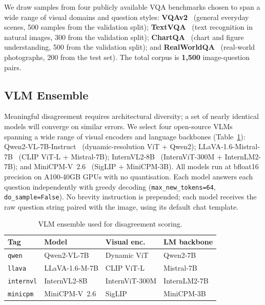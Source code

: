 \documentclass[10pt,twocolumn,letterpaper]{article}
\begin{document}
We draw samples from four publicly available VQA benchmarks chosen to span
a wide range of visual domains and question styles:
\textbf{VQAv2}~\cite{goyal2017vqav2} (general everyday scenes, 500 samples
from the validation split);
\textbf{TextVQA}~\cite{singh2019textvqa} (text recognition in natural images,
300 from the validation split);
\textbf{ChartQA}~\cite{masry2022chartqa} (chart and figure understanding,
500 from the validation split);
and \textbf{RealWorldQA}~\cite{realworldqa2024} (real-world photographs,
200 from the test set).
The total corpus is \textbf{1,500} image-question pairs.

\subsection{VLM Ensemble}
\label{sec:models}

Meaningful disagreement requires architectural diversity; a set of nearly
identical models will converge on similar errors.  We select four
open-source VLMs spanning a wide range of visual encoders and language
backbones (Table~\ref{tab:models}):
Qwen2-VL-7B-Instruct~\cite{wang2024qwen2vl} (dynamic-resolution ViT + Qwen2);
LLaVA-1.6-Mistral-7B~\cite{liu2024llava16} (CLIP ViT-L + Mistral-7B);
InternVL2-8B~\cite{chen2024internvl} (InternViT-300M + InternLM2-7B);
and MiniCPM-V~2.6~\cite{yao2024minicpmv} (SigLIP + MiniCPM-3B).
All models run at bfloat16 precision on A100-40GB GPUs with no quantisation.
Each model answers each question independently with greedy decoding
(\texttt{max\_new\_tokens=64}, \texttt{do\_sample=False}).
No brevity instruction is prepended; each model receives the raw question string
paired with the image, using its default chat template.

\begin{table}[t]
\centering
\caption{VLM ensemble used for disagreement scoring.}
\label{tab:models}
\small
\begin{tabular}{llll}
\toprule
Tag & Model & Visual enc. & LM backbone \\
\midrule
\texttt{qwen}     & Qwen2-VL-7B     & Dynamic ViT & Qwen2-7B \\
\texttt{llava}    & LLaVA-1.6-M-7B  & CLIP ViT-L  & Mistral-7B \\
\texttt{internvl} & InternVL2-8B    & InternViT-300M & InternLM2-7B \\
\texttt{minicpm}  & MiniCPM-V~2.6   & SigLIP      & MiniCPM-3B \\
\bottomrule
\end{tabular}
\end{table}
\end{document}

